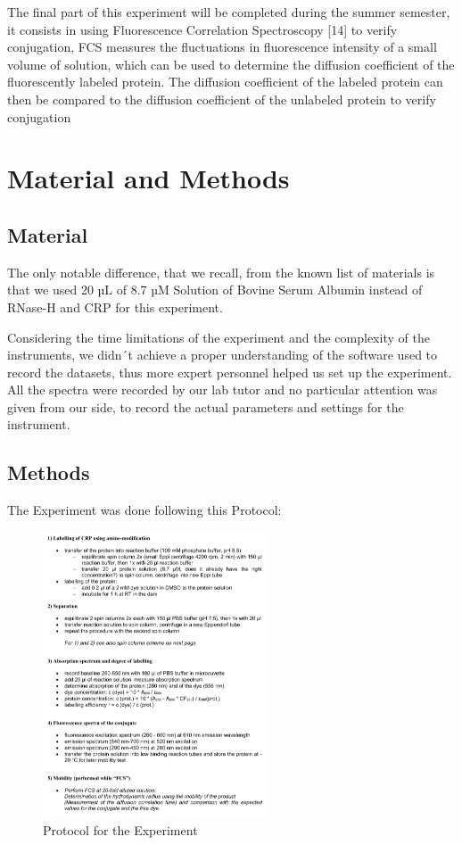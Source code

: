\documentclass[a4paper,english,12pt,bibliography=totoc]{scrreprt}
\begin{document}
The final part of this experiment will be completed during the summer semester, it consists in using Fluorescence Correlation Spectroscopy [14] to verify conjugation, FCS measures the fluctuations in fluorescence intensity of a small volume of solution, which can be used to determine the diffusion coefficient of the fluorescently labeled protein. The diffusion coefficient of the labeled protein can then be compared to the diffusion coefficient of the unlabeled protein to verify conjugation

\chapter{Material and Methods}
\label{cha:exp}

\section{Material}
\label{sec:material}

The only notable difference, that we recall, from the known list of materials is that
we used 20 µL of 8.7 µM Solution of Bovine Serum Albumin instead of RNase-H and CRP for this experiment.

Considering the time limitations of the experiment and the complexity of the instruments, we didn´t achieve a proper understanding of the software used to record the datasets, thus more expert personnel helped us set up the experiment.
All the spectra were recorded by our lab tutor and no particular attention was given from our side, to record the actual parameters and settings for the instrument.


\section{Methods}
\label{sec:methods}

The Experiment was done following this Protocol: 

\begin{figure}[H]
    \centering
    \includegraphics[width=0.6\textwidth]{protocol.png}
    \caption{Protocol for the Experiment }
    \label{fig:ViolinPlot}
\end{figure}
\end{document}
